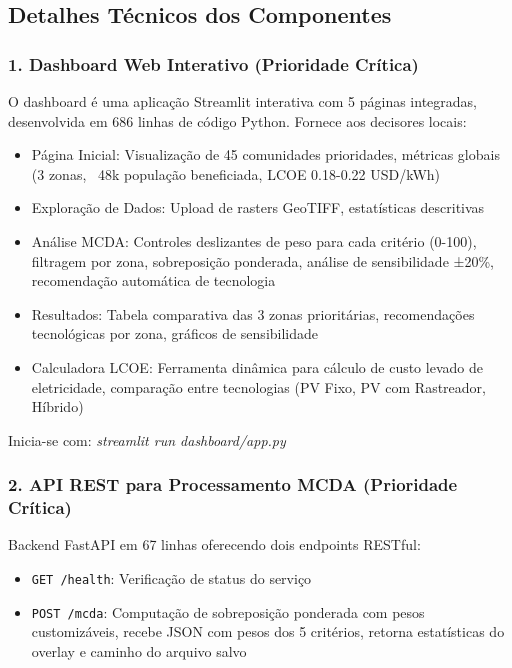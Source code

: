 \documentclass[12pt, a4paper]{article}
\begin{document}
\begin{itemize}
\subsection{Detalhes Técnicos dos Componentes}

\subsubsection{1. Dashboard Web Interativo (Prioridade Crítica)}

O dashboard é uma aplicação Streamlit interativa com 5 páginas integradas, desenvolvida em 686 linhas de código Python. Fornece aos decisores locais:

\begin{itemize}
    \item Página Inicial: Visualização de 45 comunidades prioridades, métricas globais (3 zonas, ~48k população beneficiada, LCOE 0.18-0.22 USD/kWh)
    \item Exploração de Dados: Upload de rasters GeoTIFF, estatísticas descritivas
    \item Análise MCDA: Controles deslizantes de peso para cada critério (0-100), filtragem por zona, sobreposição ponderada, análise de sensibilidade ±20\%, recomendação automática de tecnologia
    \item Resultados: Tabela comparativa das 3 zonas prioritárias, recomendações tecnológicas por zona, gráficos de sensibilidade
    \item Calculadora LCOE: Ferramenta dinâmica para cálculo de custo levado de eletricidade, comparação entre tecnologias (PV Fixo, PV com Rastreador, Híbrido)
\end{itemize}

Inicia-se com: \textit{streamlit run dashboard/app.py}

\subsubsection{2. API REST para Processamento MCDA (Prioridade Crítica)}

Backend FastAPI em 67 linhas oferecendo dois endpoints RESTful:

\begin{itemize}
    \item \texttt{GET /health}: Verificação de status do serviço
    \item \texttt{POST /mcda}: Computação de sobreposição ponderada com pesos customizáveis, recebe JSON com pesos dos 5 critérios, retorna estatísticas do overlay e caminho do arquivo salvo
\end{itemize}


\end{itemize}
\end{document}
